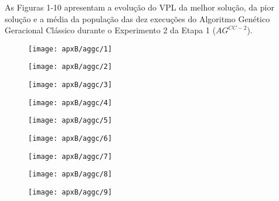 As Figuras 1-10 apresentam a evolução do VPL da melhor solução, da pior solução e a média da população das dez execuções do Algoritmo Genético Geracional Clássico durante o Experimento 2 da Etapa 1 ($AG^{CC-2}$).

\begin{figure}[H]
\centering

\texttt{[image: apxB/aggc/1]}

\end{figure}

\begin{figure}[H]
\centering

\texttt{[image: apxB/aggc/2]}

\end{figure}

\begin{figure}[H]
\centering

\texttt{[image: apxB/aggc/3]}

\end{figure}

\begin{figure}[H]
\centering

\texttt{[image: apxB/aggc/4]}

\end{figure}

\begin{figure}[H]
\centering

\texttt{[image: apxB/aggc/5]}

\end{figure}

\begin{figure}[H]
\centering

\texttt{[image: apxB/aggc/6]}

\end{figure}

\begin{figure}[H]
\centering

\texttt{[image: apxB/aggc/7]}

\end{figure}

\begin{figure}[H]
\centering

\texttt{[image: apxB/aggc/8]}

\end{figure}

\begin{figure}[H]
\centering

\texttt{[image: apxB/aggc/9]}

\end{figure}

